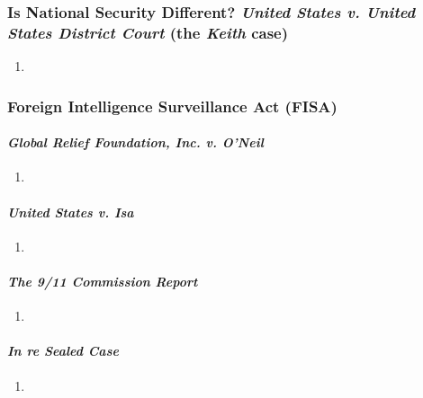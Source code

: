 \subsubsection{Is National Security Different? \emph{United States v. United 
States District Court} (the \emph{Keith} case)}

\begin{enumerate}
    \item %
\end{enumerate}

\subsubsection{Foreign Intelligence Surveillance Act (FISA)}

\paragraph{\emph{Global Relief Foundation, Inc. v. O'Neil}} %

\begin{enumerate}
    \item 
\end{enumerate}

\paragraph{\emph{United States v. Isa}} %

\begin{enumerate}
    \item 
\end{enumerate}

\paragraph{\emph{The 9/11 Commission Report}} %

\begin{enumerate}
    \item 
\end{enumerate}

\paragraph{\emph{In re Sealed Case}} %

\begin{enumerate}
    \item 
\end{enumerate}

